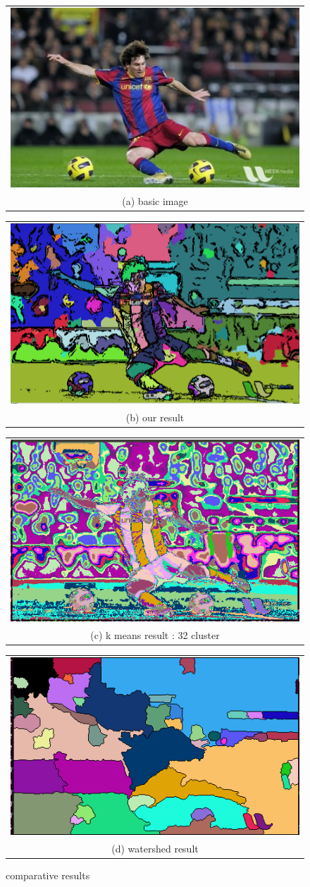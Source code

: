 \documentclass[conference]{IEEEtran}
\begin{document}
\begin{figure}[h!]
  \centering
  \begin{tabular}{@{}c@{}}
    \includegraphics[width=0.4\linewidth]{fig0.jpg} \\[\abovecaptionskip]
    \small (a) basic image
  \end{tabular}
  \begin{tabular}{@{}c@{}}
    \includegraphics[width=0.4\linewidth]{fig1.png} \\[\abovecaptionskip]
    \small (b) our result
  \end{tabular}

  \vspace{\floatsep}

  \begin{tabular}{@{}c@{}}
    \includegraphics[width=0.4\linewidth]{fig2.png} \\[\abovecaptionskip]
    \small (c) k means result : 32 cluster
  \end{tabular}
  \begin{tabular}{@{}c@{}}
    \includegraphics[width=0.4\linewidth]{fig3.png} \\[\abovecaptionskip]
    \small (d) watershed result
  \end{tabular}
  \caption{comparative results}
  \label{fig 1}
  
\end{figure}
\end{document}
